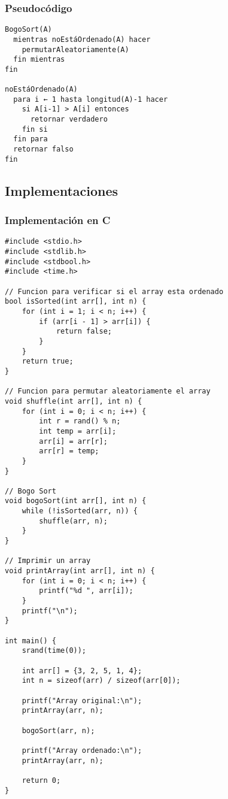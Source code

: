 \documentclass[11pt,openany]{book}
\begin{document}
\subsubsection{Pseudocódigo}
\begin{verbatim}
BogoSort(A)
  mientras noEstáOrdenado(A) hacer
    permutarAleatoriamente(A)
  fin mientras
fin

noEstáOrdenado(A)
  para i ← 1 hasta longitud(A)-1 hacer
    si A[i-1] > A[i] entonces
      retornar verdadero
    fin si
  fin para
  retornar falso
fin
\end{verbatim}

\subsection{Implementaciones}

\subsubsection{Implementación en C}
\lstset{language=C}
\begin{lstlisting}
#include <stdio.h>
#include <stdlib.h>
#include <stdbool.h>
#include <time.h>

// Funcion para verificar si el array esta ordenado
bool isSorted(int arr[], int n) {
    for (int i = 1; i < n; i++) {
        if (arr[i - 1] > arr[i]) {
            return false;
        }
    }
    return true;
}

// Funcion para permutar aleatoriamente el array
void shuffle(int arr[], int n) {
    for (int i = 0; i < n; i++) {
        int r = rand() % n;
        int temp = arr[i];
        arr[i] = arr[r];
        arr[r] = temp;
    }
}

// Bogo Sort
void bogoSort(int arr[], int n) {
    while (!isSorted(arr, n)) {
        shuffle(arr, n);
    }
}

// Imprimir un array
void printArray(int arr[], int n) {
    for (int i = 0; i < n; i++) {
        printf("%d ", arr[i]);
    }
    printf("\n");
}

int main() {
    srand(time(0));

    int arr[] = {3, 2, 5, 1, 4};
    int n = sizeof(arr) / sizeof(arr[0]);

    printf("Array original:\n");
    printArray(arr, n);

    bogoSort(arr, n);

    printf("Array ordenado:\n");
    printArray(arr, n);

    return 0;
}
\end{lstlisting}
\end{document}
